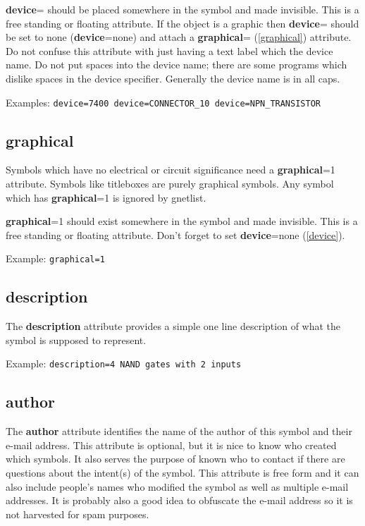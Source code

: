 \documentclass{article}
\begin{document}
{\bf device}= should be placed somewhere in the symbol and made invisible.
This is a free standing or floating attribute.  If the object is a graphic
then {\bf device}= should be set to none ({\bf device}=none) and attach
a {\bf graphical}= (\ref{graphical}) attribute.  Do not confuse this
attribute with just having a text label which the device name.  Do not
put spaces into the device name; there are some programs which dislike
spaces in the device specifier.  Generally the device name is in all caps.

Examples: \texttt{device=7400 device=CONNECTOR\_10 device=NPN\_TRANSISTOR}


\subsection{\bf graphical\label{graphical}}
Symbols which have no electrical or circuit significance need a 
{\bf graphical}=1 attribute.  Symbols like titleboxes are purely
graphical symbols.  Any symbol which has {\bf graphical}=1 is ignored
by gnetlist.

{\bf graphical}=1 should exist somewhere in the symbol and made invisible.
This is a free standing or floating attribute.  Don't forget to set 
{\bf device}=none (\ref{device}).

Example: \texttt{graphical=1}


\subsection{\bf description\label{description}}
The {\bf description} attribute provides a simple one line description of what 
the symbol is supposed to represent.  

Example: \texttt{description=4 NAND gates with 2 inputs}


\subsection{\bf author\label{author}}
The {\bf author} attribute identifies the name of the author of this
symbol and their e-mail address.  This attribute is optional, but it is
nice to know who created which symbols.  It also serves the purpose of
known who to contact if there are questions about the intent(s) of the
symbol.  This attribute is free form and it can also include people's
names who modified the symbol as well as multiple e-mail addresses.
It is probably also a good idea to obfuscate the e-mail address so it
is not harvested for spam purposes.
\end{document}
